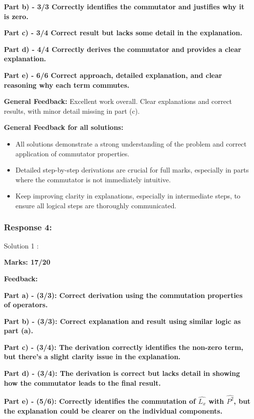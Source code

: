\documentclass[a4paper,11pt]{article}
\begin{document}
\textbf{Part b) - 3/3 Correctly identifies the commutator and justifies why it is zero.}

\textbf{Part c) - 3/4 Correct result but lacks some detail in the explanation.}

\textbf{Part d) - 4/4 Correctly derives the commutator and provides a clear explanation.}

\textbf{Part e) - 6/6 Correct approach, detailed explanation, and clear reasoning why each term commutes.}


\textbf{General Feedback:}
Excellent work overall. Clear explanations and correct results, with minor detail missing in part (c).


\textbf{General Feedback for all solutions:}
\begin{itemize}
    \item All solutions demonstrate a strong understanding of the problem and correct application of commutator properties.
    \item Detailed step-by-step derivations are crucial for full marks, especially in parts where the commutator is not immediately intuitive.
    \item Keep improving clarity in explanations, especially in intermediate steps, to ensure all logical steps are thoroughly communicated.
\end{itemize}



\subsubsection*{Response 4:}

Solution 1 :

\textbf{Marks: 17/20}

\textbf{Feedback:}

\textbf{Part a) - (3/3): Correct derivation using the commutation properties of operators.}

\textbf{Part b) - (3/3): Correct explanation and result using similar logic as part (a).}

\textbf{Part c) - (3/4): The derivation correctly identifies the non-zero term, but there’s a slight clarity issue in the explanation.}

\textbf{Part d) - (3/4): The derivation is correct but lacks detail in showing how the commutator leads to the final result.}

\textbf{Part e) - (5/6): Correctly identifies the commutation of $\hat{L_x}$ with $\hat{P^2}$, but the explanation could be clearer on the individual components.}
\end{document}
